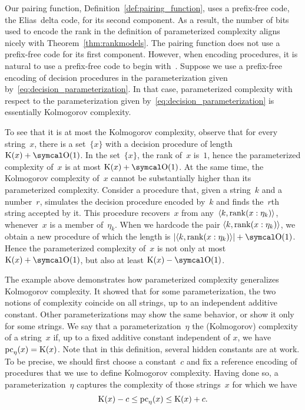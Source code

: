 \begin{example}
\label{ex:traditional_pc}%
  Our pairing function, Definition~\ref{def:pairing_function}, uses a prefix-free code, the Elias~delta code, for its second component.
  As a result, the number of bits used to encode the rank in the definition of parameterized complexity aligns nicely with Theorem~\ref{thm:rankmodels}.
  The pairing function does not use a prefix-free code for its first component.
  However, when encoding procedures, it is natural to use a prefix-free code to begin with~\parencite{li2008introduction}.
  Suppose we use a prefix-free encoding of decision procedures in the parameterization given by~\eqref{eq:decision_parameterization}.
  In that case, parameterized complexity with respect to the parameterization given by~\eqref{eq:decision_parameterization} is essentially Kolmogorov complexity.

  To see that it is at most the Kolmogorov complexity, observe that for every string~$x$, there is a set~$\{x\}$ with a decision procedure of length $\KC(x) + \bigO(1)$.
  In the set~$\{x\}$, the rank of~$x$ is~$1$, hence the parameterized complexity of~$x$ is at most $\KC(x) + \bigO(1)$.
  At the same time, the Kolmogorov complexity of~$x$ cannot be substantially higher than its parameterized complexity.
  Consider a procedure that, given a string~$k$ and a number~$r$, simulates the decision procedure encoded by~$k$ and finds the~$r$th string accepted by it.
  This procedure recovers~$x$ from any~${\langle k, \operatorname{rank}(x : \eta_k)\rangle}$, whenever~$x$ is a member of~$\eta_k$.
  When we hardcode the pair ${\langle k, \operatorname{rank}(x : \eta_k)\rangle}$, we obtain a new procedure of which the length is $\length{\pair{k}{\rank(x : \eta_k)}} + \bigO(1)$.
  Hence the parameterized complexity of~$x$ is not only at most $\KC(x) + \bigO(1)$, but also at least $\KC(x) - \bigO(1)$.
\end{example}

The example above demonstrates how parameterized complexity generalizes Kolmogorov complexity.
It showed that for some parameterization, the two notions of complexity coincide on all strings, up to an independent additive constant.
Other parameterizations may show the same behavior, or show it only for some strings.
We say that a parameterization~$\eta$  the (Kolmogorov) complexity of a string~$x$ if, up to a fixed additive constant independent of $x$, we have $\operatorname{pc}_\eta(x) = \operatorname{K}(x)$.
Note that in this definition, several hidden constants are at work.
To be precise, we should first choose a constant~$c$ and fix a reference encoding of procedures that we use to define Kolmogorov complexity.
Having done so, a parameterization~$\eta$ captures the complexity of those strings~$x$ for which we have
\begin{equation*}
  \operatorname{K}(x) - c \le \operatorname{pc}_\eta(x) \le \operatorname{K}(x) + c.
\end{equation*}

